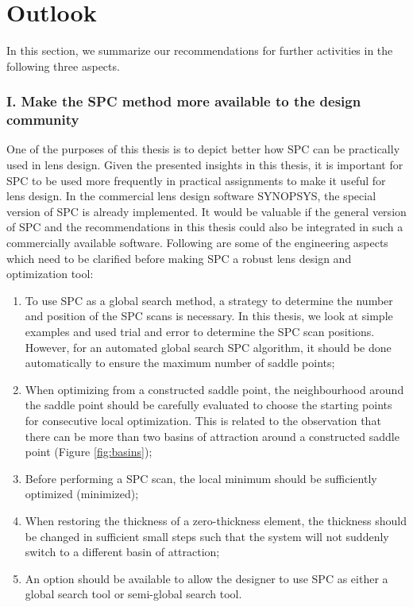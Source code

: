 \newpage

\section{Outlook}
In this section, we summarize our recommendations for further activities in the following three aspects.

\subsubsection{I. Make the SPC method more available to the design community}

One of the purposes of this thesis is to depict better how SPC can be practically used in lens design. Given the presented insights in this thesis, it is important for SPC to be used more frequently in practical assignments to make it useful for lens design. In the commercial lens design software SYNOPSYS\texttrademark \cite{SYNOPSYSSW}, the special version of SPC is already implemented. It would be valuable if the general version of SPC and the recommendations in this thesis could also be integrated in such a commercially available software. Following are some of the engineering aspects which need to be clarified before making SPC a robust lens design and optimization tool:
\begin{enumerate}[nosep]
\item To use SPC as a global search method, a strategy to determine the number and position of the SPC scans is necessary. In this thesis, we look at simple examples and used trial and error to determine the SPC scan positions. However, for an automated global search SPC algorithm, it should be done automatically to ensure the maximum number of saddle points;
\item When optimizing from a constructed saddle point, the neighbourhood around the saddle point should be carefully evaluated to choose the starting points for consecutive local optimization. This is related to the observation that there can be more than two basins of attraction around a constructed saddle point (Figure \ref{fig:basins});
\item Before performing a SPC scan, the local minimum should be sufficiently optimized (minimized); 
\item When restoring the thickness of a zero-thickness element, the thickness should be changed in sufficient small steps such that the system will not suddenly switch to a different basin of attraction; 
\item  An option should be available to allow the designer to use SPC as either a global search tool or semi-global search tool. 
\end{enumerate}


